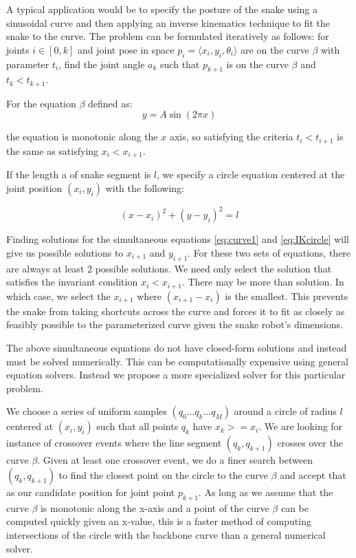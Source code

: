 A typical application would be to specify the posture of the snake using a sinusoidal curve and then applying an inverse kinematics technique to fit the snake to the curve.   The problem can be formulated iteratively as follows: for joints $i \in [0,k]$ and joint pose in space $p_i = \langle x_i,y_i,\theta_i \rangle $ are on the curve $\beta$ with parameter $t_i$, find the joint angle $a_k$ such that $p_{k+1}$ is on the curve $\beta$ and $t_k < t_{k+1}$.

For the equation $\beta$ defined as:
\begin{equation}
\label{eq:curve1}
y = A\sin(2\pi x)
\end{equation}

the equation is monotonic along the $x$ axis, so satisfying the criteria $t_i < t_{i+1}$ is the same as satisfying $x_i < x_{i+1}$.  

If the length a of snake segment is $l$, we specify a circle equation centered at the joint position $(x_i,y_i)$ with the following:

\begin{equation}
\label{eq:IKcircle}
(x-x_i)^2 + (y-y_i)^2 = l
\end{equation}

Finding solutions for the simultaneous equations \ref{eq:curve1} and \ref{eq:IKcircle} will give us possible solutions to $x_{i+1}$ and $y_{i+1}$.  For these two sets of equations, there are always at least 2 possible solutions.  We need only select the solution that satisfies the invariant condition $x_i < x_{i+1}$.   There may be more than solution.  In which case, we select the $x_{i+1}$ where $(x_{i+1}-x_i)$ is the smallest.  This prevents the snake from taking shortcuts across the curve and forces it to fit as closely as feasibly possible to the parameterized curve given the snake robot’s dimensions.

The above simultaneous equations do not have closed-form solutions and instead must be solved numerically.  This can be computationally expensive using general equation solvers.  Instead we propose a more specialized solver for this particular problem.

We choose a series of uniform samples $(q_0 ... q_k ... q_M)$ around a circle of radius $l$ centered at $(x_i,y_i)$ such that all points $q_k$ have $x_k >= x_i$.  We are looking for instance of crossover events where the line segment $(q_k,q_{k+1})$ crosses over the curve $\beta$.   Given at least one crossover event, we do a finer search between $(q_k, q_{k+1})$ to find the closest point on the circle to the curve $\beta$ and accept that as our candidate position for joint point $p_{k+1}$.   As long as we assume that the curve $\beta$ is monotonic along the x-axis and a point of the curve $\beta$ can be computed quickly given an x-value, this is a faster method of computing intersections of the circle with the backbone curve than a general numerical solver.

